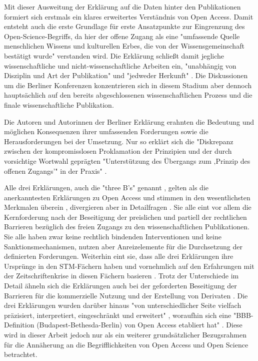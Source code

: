 \begin{enumerate}
Mit dieser Ausweitung der Erklärung auf die Daten hinter den Publikationen formiert sich erstmals ein klares erweitertes Verständnis von Open Access. Damit entsteht auch die erste Grundlage für erste Ansatzpunkte zur Eingrenzung des Open-Science-Begriffs, da hier der offene Zugang als eine "umfassende Quelle menschlichen Wissens und kulturellen Erbes, die von der Wissensgemeinschaft bestätigt wurde" \cite{Berliner_Erklaerung_2003} verstanden wird. Die Erklärung schließt damit jegliche wissenschaftliche und nicht-wissenschaftliche Arbeiten ein, "unabhängig von Disziplin und Art der Publikation" und "jedweder Herkunft" \cite{Naeder_2010}. Die Diskussionen um die Berliner Konferenzen konzentrieren sich in diesem Stadium aber dennoch hauptsächlich auf den bereits abgeschlossenen wissenschaftlichen Prozess und die finale wissenschaftliche Publikation.

Die Autoren und Autorinnen der Berliner Erklärung erahnten die Bedeutung und möglichen Konsequenzen ihrer umfassenden Forderungen sowie die Herausforderungen bei der Umsetzung. Nur so erklärt sich die "Diskrepanz zwischen der kompromisslosen Proklamation der Prinzipien und der durch vorsichtige Wortwahl geprägten "Unterstützung des Übergangs zum ‚Prinzip des offenen Zugangs’" in der Praxis" \cite{Lossau_2007}.
\end{enumerate}

Alle drei Erklärungen, auch die "three B's" genannt \cite{Suber_2004}, gelten als die anerkanntesten Erklärungen zu Open Access und stimmen in den wesentlichsten Merkmalen überein \cite{Albert_2006}, divergieren aber in Detailfragen \cite{Naeder_2010}. Sie alle eint vor allem die Kernforderung nach der Beseitigung der preislichen und partiell der rechtlichen Barrieren bezüglich des freien Zugangs zu den wissenschaftlichen Publikationen. Sie alle haben zwar keine rechtlich bindenden Interventionen und keine Sanktionsmechanismen, nutzen aber Anreizelemente für die Durchsetzung der definierten Forderungen. Weiterhin eint sie, dass alle drei Erklärungen ihre Ursprünge in den STM-Fächern haben und vornehmlich auf den Erfahrungen mit der Zeitschriftenkrise in diesen Fächern basieren \cite{Naeder_2010}. Trotz der Unterschiede im Detail ähneln sich die Erklärungen auch bei der geforderten Beseitigung der Barrieren für die kommerzielle Nutzung und der Erstellung von Derivaten \cite{CREATe_2014}. Die drei Erklärungen wurden darüber hinaus "von unterschiedlicher Seite vielfach präzisiert, interpretiert, eingeschränkt und erweitert" \cite{Naeder_2010}, woraufhin sich eine "BBB-
Definition (Budapest-Bethesda-Berlin) von Open Access etabliert hat" \cite{Schirmbacher_2007}. Diese wird in dieser Arbeit jedoch nur als ein weiterer grundsätzlicher Bezugsrahmen für die Annäherung an die Begrifflichkeiten von Open Access und Open Science betrachtet.

